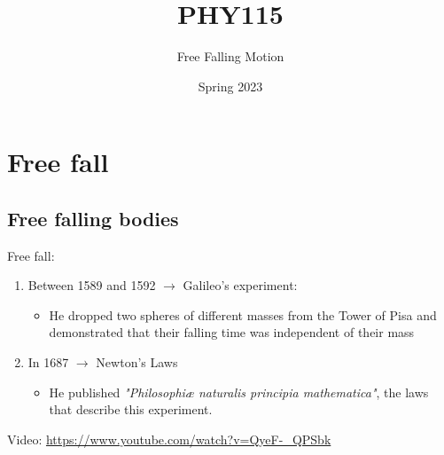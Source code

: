 \documentclass[]{beamer}
\title{PHY115}    %
\author{Free Falling Motion}                 %
\institute{Digipen}      %
\date{Spring 2023}
\begin{document}
\begin{frame}
  \titlepage
\end{frame}

\section[]{}

\begin{frame}
  \tableofcontents
\end{frame}

\section{Free fall}
\subsection{Free falling bodies}

\begin{frame}
    Free fall:
    \vspace{3mm}

\begin{enumerate}
\item Between  1589 and 1592 $\rightarrow$ Galileo's experiment:
      \begin{itemize}
          \item He dropped two spheres of different masses from the Tower 
          of Pisa and  demonstrated that their falling time was independent of their mass
      \end{itemize}
      \pause
      \vspace{3mm}

\item In 1687 $\rightarrow$ Newton's Laws
    \begin{itemize}
        \item He published \textit{"Philosophiæ naturalis principia mathematica"}, the laws that describe this experiment.
    \end{itemize}

\end{enumerate}
 
\vspace{3mm}

    Video: \url{https://www.youtube.com/watch?v=QyeF-_QPSbk}

\end{frame}  
\end{document}
